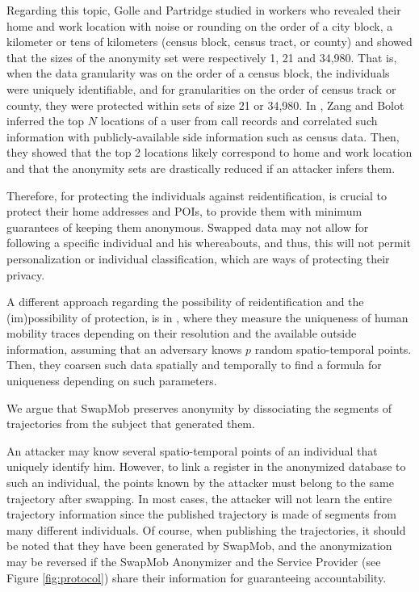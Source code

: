 \documentclass{llncs}
\begin{document}
Regarding this topic, Golle and Partridge studied in \cite{Golle:2009} workers who revealed their home and work location with noise or rounding on the order of a city block, a kilometer or tens of kilometers (census block, census tract, or county) and showed that the sizes of the anonymity set were respectively 1, 21 and 34,980. That is, when the data granularity was on the order of a census block, the individuals were uniquely identifiable, and for granularities on the order of census track or county, they were protected within sets of size 21 or 34,980.
In \cite{Zang:2011},  Zang and Bolot inferred the top $N$ locations of a user from call records and correlated such information with publicly-available side  information such as census data.  Then, they showed that the top 2 locations likely correspond to home and work location and that the anonymity sets are drastically reduced if an attacker infers them.


Therefore, for protecting the individuals against reidentification, is crucial to protect their home addresses and POIs, to provide them with minimum guarantees of keeping them anonymous.
Swapped data may not allow for following a specific individual and his whereabouts, and thus, this will not permit personalization or individual classification, which are ways of protecting their privacy.


A different approach regarding the possibility of reidentification and the (im)possibility of protection, is in \cite{demontjoye2013}, where they measure the uniqueness of human mobility traces depending on their resolution and the available outside information, assuming that an adversary knows $p$ random spatio-temporal points. Then, they coarsen such data spatially and temporally to find a formula for uniqueness depending on such parameters.


We argue that SwapMob preserves anonymity by dissociating the segments of trajectories from the subject that generated them.

{\color{red} An attacker may know several spatio-temporal points of an
  individual that uniquely identify him. However, to link a register
  in the anonymized database to such an individual, the points known
  by the attacker must belong to the same trajectory after swapping.
  In most cases, the attacker will not learn the entire trajectory
  information since the published trajectory is made of segments from
  many different individuals. Of course, when publishing the
  trajectories, it should be noted that they have been generated by
  SwapMob, and the anonymization may be reversed if the SwapMob
  Anonymizer and the Service Provider (see Figure \ref{fig:protocol})
  share their information for guaranteeing accountability.}
\end{document}

